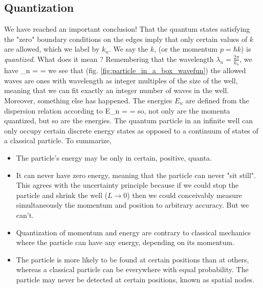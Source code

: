 \documentclass{Textbook}
\begin{document}
\subsection{Quantization}
We have reached an important conclusion! That the quantum states satisfying the "zero" boundary conditions on the edges imply that only certain values of $k$ are allowed, which we label by $k_n$. We say the $k$, (or the momentum $p=\hbar k$) is \emph{quantized}. What does it mean ? Remembering that the wavelength $\lambda_n = \frac{2\pi}{k_n}$, we have
\be
\lambda_n =  = 
\ee
{}
we see that (fig. \ref{fig:particle_in_a_box_wavefun}) the allowed waves are ones with wavelength as integer multiples of the size of the well, meaning that we can fit exactly an integer number of waves in the well.
Moreover, something else has happened. The energies $E_n$ are defined from the dispersion relation according to
\be
E_n =  =  
\ee
so, not only are the momenta quantized, but so are the energies. The quantum particle in an infinite well can only occupy certain discrete energy states as opposed to a continuum of states of a classical particle. To summarize, 
\begin{itemize}
  \item The particle's energy may be only in certain, positive, quanta.
  \item It can never have zero energy, meaning that the particle can never "sit still". This agrees with the uncertainty principle because if we could stop the particle and shrink the well ($L\rightarrow 0$) then we could conceivably measure simultaneously the momentum and position to arbitrary accuracy. But we can't.
  \item Quantization of momentum and energy are contrary to classical mechanics where the particle can have any energy, depending on its momentum.
  \item The particle is more likely to be found at certain positions than at others, whereas a classical particle can be everywhere with equal probability. The particle may never be detected at certain positions, known as spatial nodes.
\end{itemize}
 
\end{document}
